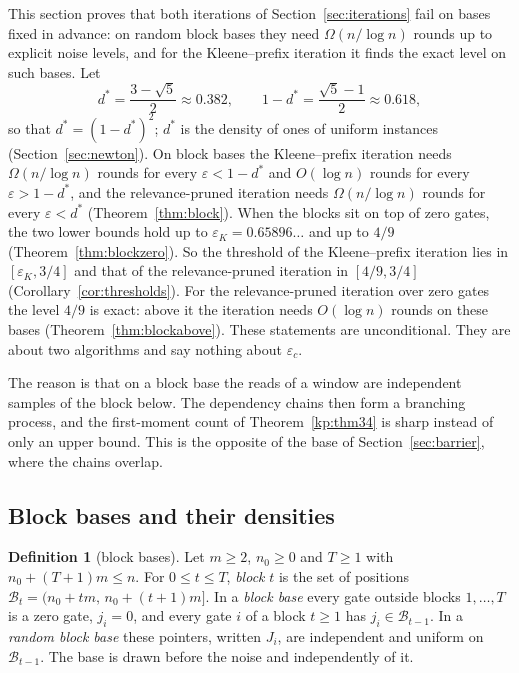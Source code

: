 \documentclass[11pt]{amsart}
\theoremstyle{definition}
\newtheorem{definition}[theorem]{Definition}
\theoremstyle{remark}
\newcommand{\eps}{\varepsilon}
\begin{document}
This section proves that both iterations of Section~\ref{sec:iterations} fail on bases fixed in
advance: on random block bases they need $\Omega(n/\log n)$ rounds up to explicit noise levels,
and for the Kleene--prefix iteration it finds the exact level on such bases. Let
\[
d^*=\frac{3-\sqrt5}{2}\approx0.382,\qquad 1-d^*=\frac{\sqrt5-1}{2}\approx0.618 ,
\]
so that $d^*=(1-d^*)^2$; $d^*$ is the density of ones of uniform instances (Section~\ref{sec:newton}). On block bases
the Kleene--prefix iteration needs $\Omega(n/\log n)$ rounds for every $\eps<1-d^*$ and
$O(\log n)$ rounds for every $\eps>1-d^*$, and the relevance-pruned iteration needs
$\Omega(n/\log n)$ rounds for every $\eps<d^*$ (Theorem~\ref{thm:block}). When the blocks sit on
top of zero gates, the two lower bounds hold up to $\eps_K=0.65896\ldots$ and up to $4/9$
(Theorem~\ref{thm:blockzero}). So the threshold of the Kleene--prefix iteration lies in
$[\eps_K,3/4]$ and that of the relevance-pruned iteration in $[4/9,3/4]$
(Corollary~\ref{cor:thresholds}). For the relevance-pruned iteration over zero gates the level
$4/9$ is exact: above it the iteration needs $O(\log n)$ rounds on these bases
(Theorem~\ref{thm:blockabove}). These statements are unconditional. They are
about two algorithms and say nothing about $\eps_c$.

The reason is that on a block base the reads of a window are independent samples of the block
below. The dependency chains then form a branching process, and the first-moment count of Theorem~\ref{kp:thm34} is
sharp instead of only an upper bound. This is the opposite of the base of Section~\ref{sec:barrier},
where the chains overlap.

\subsection{Block bases and their densities}

\begin{definition}[block bases]\label{def:block}
Let $m\ge2$, $n_0\ge0$ and $T\ge1$ with $n_0+(T+1)m\le n$. For $0\le t\le T$, \emph{block} $t$ is
the set of positions $\mathcal B_t=(n_0+tm,\,n_0+(t+1)m]$. In a \emph{block base} every gate
outside blocks $1,\dots,T$ is a zero gate, $j_i=0$, and every gate $i$ of a block $t\ge1$ has
$j_i\in\mathcal B_{t-1}$. In a \emph{random block base} these pointers, written $J_i$, are
independent and uniform on $\mathcal B_{t-1}$. The base is drawn before the noise and independently
of it.
\end{definition}
\end{document}
